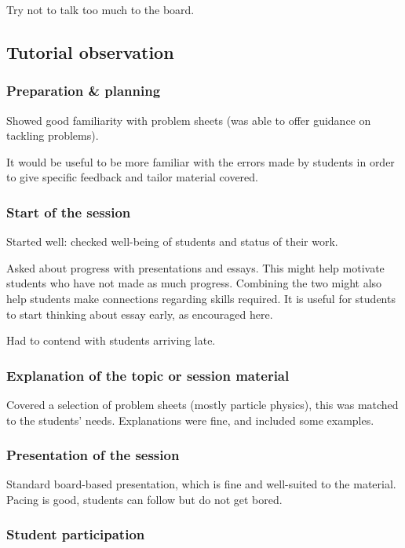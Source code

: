 Try not to talk too much to the board.


\subsection{Tutorial observation}\label{sec:other-tutorial}

\subsubsection{Preparation \& planning}

Showed good familiarity with problem sheets (was able to offer guidance on tackling problems).

It would be useful to be more familiar with the errors made by students in order to give specific feedback and tailor material covered.

\subsubsection{Start of the session}

Started well: checked well-being of students and status of their work.

Asked about progress with presentations and essays. This might help motivate students who have not made as much progress. Combining the two might also help students make connections regarding skills required. It is useful for students to start thinking about essay early, as encouraged here.

Had to contend with students arriving late.

\subsubsection{Explanation of the topic or session material}

Covered a selection of problem sheets (mostly particle physics), this was matched to the students' needs. Explanations were fine, and included some examples.

\subsubsection{Presentation of the session}

Standard board-based presentation, which is fine and well-suited to the material. Pacing is good, students can follow but do not get bored.

\subsubsection{Student participation}

